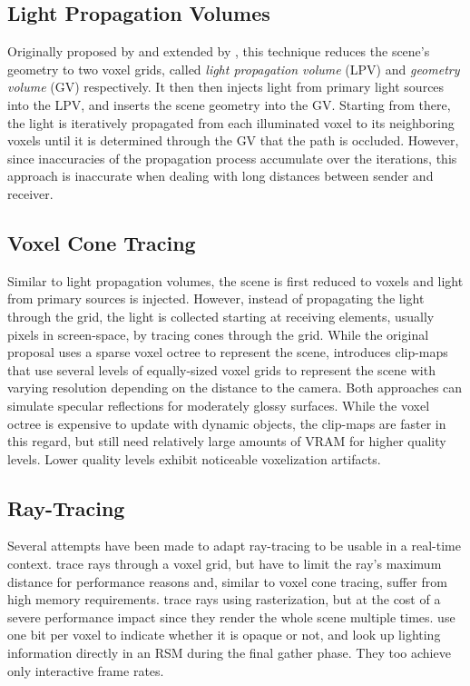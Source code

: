 \subsection{Light Propagation Volumes}

Originally proposed by \citet{Kaplanyan:2010:LPV} and extended by \citet{Kaplanyan:2010:LPV2}, this technique reduces the scene's geometry to two voxel grids, called \emph{light propagation volume} (LPV) and \emph{geometry volume} (GV) respectively. It then then injects light from primary light sources into the LPV, and inserts the scene geometry into the GV. Starting from there, the light is iteratively propagated from each illuminated voxel to its neighboring voxels until it is determined through the GV that the path is occluded. However, since inaccuracies of the propagation process accumulate over the iterations, this approach is inaccurate when dealing with long distances between sender and receiver.


\subsection{Voxel Cone Tracing}

Similar to light propagation volumes, the scene is first reduced to voxels and light from primary sources is injected. However, instead of propagating the light through the grid, the light is collected starting at receiving elements, usually pixels in screen-space, by tracing cones through the grid.
While the original proposal \citep{Crassin:2012:OctreeVCT} uses a sparse voxel octree to represent the scene, \citet{Panteleev:2015:VXGI} introduces clip-maps that use several levels of equally-sized voxel grids to represent the scene with varying resolution depending on the distance to the camera.
Both approaches can simulate specular reflections for moderately glossy surfaces. While the voxel octree is expensive to update with dynamic objects, the clip-maps are faster in this regard, but still need relatively large amounts of VRAM for higher quality levels. Lower quality levels exhibit noticeable voxelization artifacts.


\subsection{Ray-Tracing}

Several attempts have been made to adapt ray-tracing to be usable in a real-time context.
\citet{Thiedemann:2011:VGI} trace rays through a voxel grid, but have to limit the ray's maximum distance for performance reasons and, similar to voxel cone tracing, suffer from high memory requirements.
\citet{Tokuyoshi:2012:pathtracingrasterization} trace rays using rasterization, but at the cost of a severe performance impact since they render the whole scene multiple times.
\citet{Chen:2016:Compactvoxels} use one bit per voxel to indicate whether it is opaque or not, and look up lighting information directly in an RSM during the final gather phase. They too achieve only interactive frame rates.


